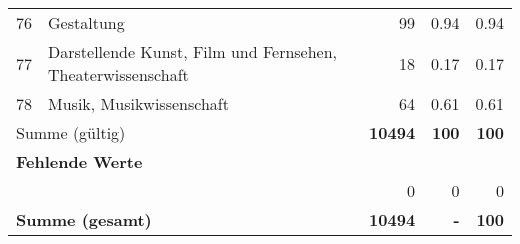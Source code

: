 \begin{longtable}{lXrrr}
        76 & \multicolumn{1}{X}{Gestaltung} & %
          \num{99} &
          \num[round-mode=places,round-precision=2]{0,94} &
          \num[round-mode=places,round-precision=2]{0,94} \\

        77 & \multicolumn{1}{X}{Darstellende Kunst, Film und Fernsehen, Theaterwissenschaft} & %
          \num{18} &
          \num[round-mode=places,round-precision=2]{0,17} &
          \num[round-mode=places,round-precision=2]{0,17} \\

        78 & \multicolumn{1}{X}{Musik, Musikwissenschaft} & %
          \num{64} &
          \num[round-mode=places,round-precision=2]{0,61} &
          \num[round-mode=places,round-precision=2]{0,61} \\

     \midrule
     \multicolumn{2}{l}{Summe (gültig)} &
       \textbf{\num{10494}} &
     \textbf{100} &
       \textbf{\num[round-mode=places,round-precision=2]{100}} \\
     \multicolumn{5}{l}{\textbf{Fehlende Werte}}\\
      & & 0 & 0 & 0 \\
     \midrule
     \multicolumn{2}{l}{\textbf{Summe (gesamt)}} &
          \textbf{\num{10494}} &
        \textbf{-} &
        \textbf{100} \\
     \bottomrule
     \end{longtable}
     
